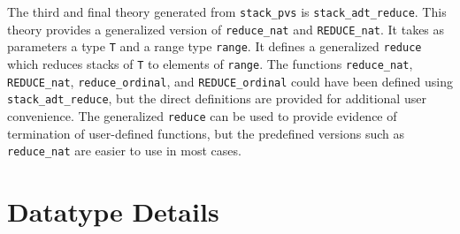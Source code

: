 The third and final theory generated from \texttt{stack\_pvs} is
\texttt{stack\_adt\_reduce}.  This theory provides a generalized version
of \texttt{reduce\_nat} and \texttt{REDUCE\_nat}.  It takes as parameters
a type \texttt{T} and a range type \texttt{range}.  It defines a
generalized \texttt{reduce} which reduces stacks of \texttt{T} to elements
of \texttt{range}.  The functions \texttt{reduce\_nat},
\texttt{REDUCE\_nat}, \texttt{reduce\_ordinal}, and
\texttt{REDUCE\_ordinal} could have been defined using
\texttt{stack\_adt\_reduce}, but the direct definitions are provided for
additional user convenience.  The generalized \texttt{reduce} can be used
to provide evidence of termination of user-defined functions, but the
predefined versions such as \texttt{reduce\_nat} are easier to use in most
cases.

\section{Datatype Details}

